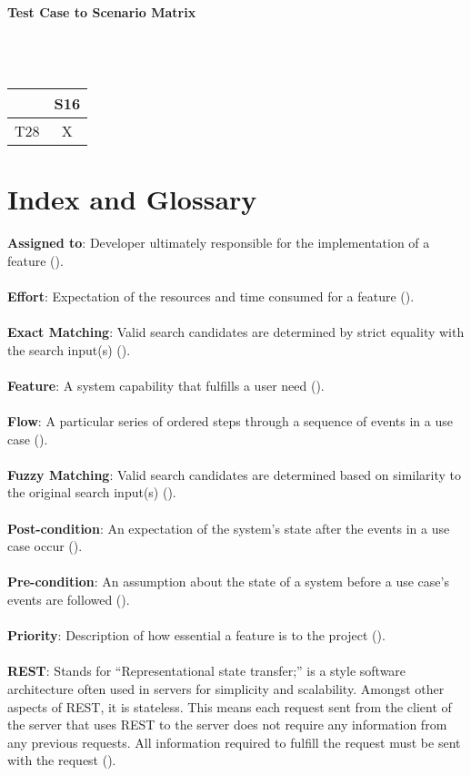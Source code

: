 \documentclass{article}
\begin{document}
\paragraph{Test Case to Scenario Matrix}~\\ \\
\begin{tabular}{ | c || c | }
\hline
    & S16  \\
\hline
\hline
T28 &  X  \\
\hline

\end{tabular}
\section{Index and Glossary}
\textbf{Assigned to}: Developer ultimately responsible for the implementation of a feature (\pageref{feature}).\\ \\
\textbf{Effort}: Expectation of the resources and time consumed for a feature (\pageref{feature}).\\ \\
\textbf{Exact Matching}: Valid search candidates are determined by strict equality with the search input(s) (\pageref{feature}).\\ \\
\textbf{Feature}: A system capability that fulfills a user need (\pageref{feature}).\\ \\
\textbf{Flow}: A particular series of ordered steps through a sequence of events in a use case (\pageref{flow}).\\ \\
\textbf{Fuzzy Matching}: Valid search candidates are determined based on similarity to the original search input(s) (\pageref{feature}).\\ \\
\textbf{Post-condition}: An expectation of the system's state after the events in a use case occur (\pageref{post_cond}).\\ \\
\textbf{Pre-condition}: An assumption about the state of a system before a use case's events are followed (\pageref{pre_cond}).\\ \\
\textbf{Priority}: Description of how essential a feature is to the project (\pageref{feature}).\\ \\
\textbf{REST}: Stands for ``Representational state transfer;'' is a style software architecture often used in servers for simplicity and scalability. Amongst other aspects of REST, it is stateless. This means each request sent from the client of the server that uses REST to the server does not require any information from any previous requests. All information required to fulfill the request must be sent with the request (\pageref{rest}).\\ \\
\end{document}
